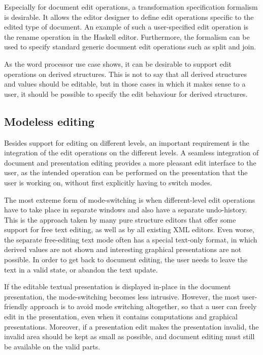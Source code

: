 Especially for document edit operations, a transformation specification formalism is desirable. It allows the editor designer to define edit operations specific to the edited type of document. An example of such a user-specified edit operation is the rename operation in the Haskell editor. Furthermore, the formalism can be used to specify standard generic document edit operations such as split and join.


As the word processor use case shows, it can be desirable to support edit operations on derived structures. This is not to say that all derived structures and values should be editable, but in those cases in which it makes sense to a user, it should be possible to specify the edit behaviour for derived structures.


%																
\subsection{Modeless editing}

Besides support for editing on different levels, an important requirement is the integration of the edit operations on the different levels. A seamless integration of document and presentation editing provides a more pleasant edit interface to the user, as the intended operation can be performed on the presentation that the user is working on, without first explicitly having to switch modes.

The most extreme form of mode-switching is when different-level edit operations have to take place in separate windows and also have a separate undo-history. This is the approach taken by many pure structure editors that offer some support for free text editing, as well as by all existing XML editors. Even worse, the separate free-editing text mode often has a special text-only format, in which derived values are not shown and interesting graphical presentations are not possible. In order to get back to document editing, the user needs to leave the text in a valid state, or abandon the text update.

If the editable textual presentation is displayed in-place in the document presentation, the mode-switching becomes less intrusive. However, the most user-friendly approach is to avoid mode switching altogether, so that a user can freely edit in the presentation, even when it contains computations and graphical presentations. Moreover, if a presentation edit makes the presentation invalid, the invalid area should be kept as small as possible, and document editing must still be available on the valid parts.



